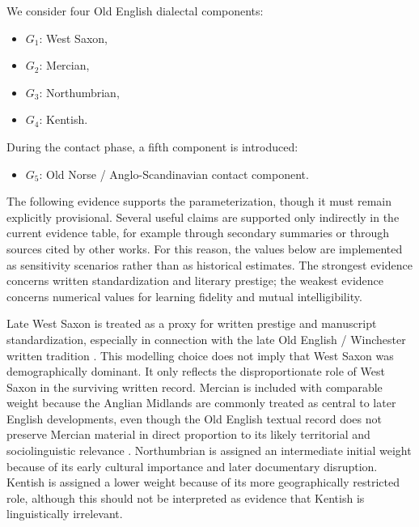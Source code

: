 \documentclass[11pt]{article}
\begin{document}
We consider four Old English dialectal components:
\begin{itemize}[noitemsep]
    \item $G_1$: West Saxon,
    \item $G_2$: Mercian,
    \item $G_3$: Northumbrian,
    \item $G_4$: Kentish.
\end{itemize}
During the contact phase, a fifth component is introduced:
\begin{itemize}[noitemsep]
    \item $G_5$: Old Norse / Anglo-Scandinavian contact component.
\end{itemize}

The following evidence supports the parameterization, though it must remain explicitly provisional. Several useful claims are supported only indirectly in the current evidence table, for example through secondary summaries or through sources cited by other works. For this reason, the values below are implemented as sensitivity scenarios rather than as historical estimates. The strongest evidence concerns written standardization and literary prestige; the weakest evidence concerns numerical values for learning fidelity and mutual intelligibility.

Late West Saxon is treated as a proxy for written prestige and manuscript standardization, especially in connection with the late Old English / Winchester written tradition \citep{gneuss1972standard,hofstetter1988winchester,gretsch2001winchester}. This modelling choice does not imply that West Saxon was demographically dominant. It only reflects the disproportionate role of West Saxon in the surviving written record. Mercian is included with comparable weight because the Anglian Midlands are commonly treated as central to later English developments, even though the Old English textual record does not preserve Mercian material in direct proportion to its likely territorial and sociolinguistic relevance \citep{hogg1992cambridge,baugh2012history}. Northumbrian is assigned an intermediate initial weight because of its early cultural importance and later documentary disruption. Kentish is assigned a lower weight because of its more geographically restricted role, although this should not be interpreted as evidence that Kentish is linguistically irrelevant.
\end{document}

